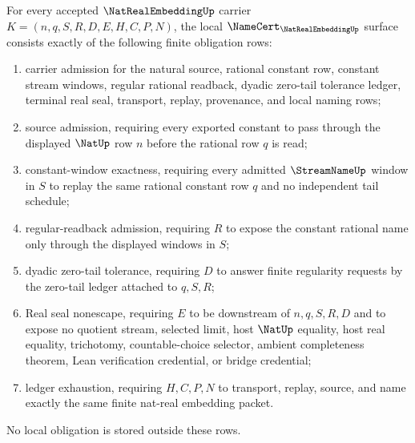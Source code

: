 \begin{theorem}
\label{thm:nat-real-embedding-namecert-obligations}
For every accepted $\NatRealEmbeddingUp$ carrier $K=(n,q,S,R,D,E,H,C,P,N)$, the local $\NameCert_{\NatRealEmbeddingUp}$ surface consists exactly of the following finite obligation rows:
\begin{enumerate}
\item carrier admission for the natural source, rational constant row, constant stream windows, regular rational readback, dyadic zero-tail tolerance ledger, terminal real seal, transport, replay, provenance, and local naming rows;
\item source admission, requiring every exported constant to pass through the displayed $\NatUp$ row $n$ before the rational row $q$ is read;
\item constant-window exactness, requiring every admitted $\StreamNameUp$ window in $S$ to replay the same rational constant row $q$ and no independent tail schedule;
\item regular-readback admission, requiring $R$ to expose the constant rational name only through the displayed windows in $S$;
\item dyadic zero-tail tolerance, requiring $D$ to answer finite regularity requests by the zero-tail ledger attached to $q,S,R$;
\item Real seal nonescape, requiring $E$ to be downstream of $n,q,S,R,D$ and to expose no quotient stream, selected limit, host $\NatUp$ equality, host real equality, trichotomy, countable-choice selector, ambient completeness theorem, Lean verification credential, or bridge credential;
\item ledger exhaustion, requiring $H,C,P,N$ to transport, replay, source, and name exactly the same finite nat-real embedding packet.
\end{enumerate}
No local obligation is stored outside these rows.
\end{theorem}

